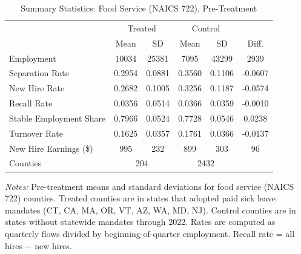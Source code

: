 \begin{table}[t]
\centering
\begin{threeparttable}
\caption{Summary Statistics: Food Service (NAICS 722), Pre-Treatment}
\label{tab:sumstats}
\small
\begin{tabular}{lccccc}
\hline\hline
 & \multicolumn{2}{c}{Treated} & \multicolumn{2}{c}{Control} & \\
 & Mean & SD & Mean & SD & Diff. \\
\hline
Employment & 10034 & 25381 & 7095 & 43299 & 2939 \\
Separation Rate & 0.2954 & 0.0881 & 0.3560 & 0.1106 & -0.0607 \\
New Hire Rate & 0.2682 & 0.1005 & 0.3256 & 0.1187 & -0.0574 \\
Recall Rate & 0.0356 & 0.0514 & 0.0366 & 0.0359 & -0.0010 \\
Stable Employment Share & 0.7966 & 0.0524 & 0.7728 & 0.0546 & 0.0238 \\
Turnover Rate & 0.1625 & 0.0357 & 0.1761 & 0.0366 & -0.0137 \\
New Hire Earnings (\$) & 995 & 232 & 899 & 303 & 96 \\
\hline
Counties & \multicolumn{2}{c}{204} & \multicolumn{2}{c}{2432} & \\
\hline\hline
\end{tabular}
\begin{tablenotes}[flushleft]
\footnotesize
\item \textit{Notes:} Pre-treatment means and standard deviations for food service (NAICS 722) counties. Treated counties are in states that adopted paid sick leave mandates (CT, CA, MA, OR, VT, AZ, WA, MD, NJ). Control counties are in states without statewide mandates through 2022. Rates are computed as quarterly flows divided by beginning-of-quarter employment. Recall rate = all hires $-$ new hires.
\end{tablenotes}
\end{threeparttable}
\end{table}

